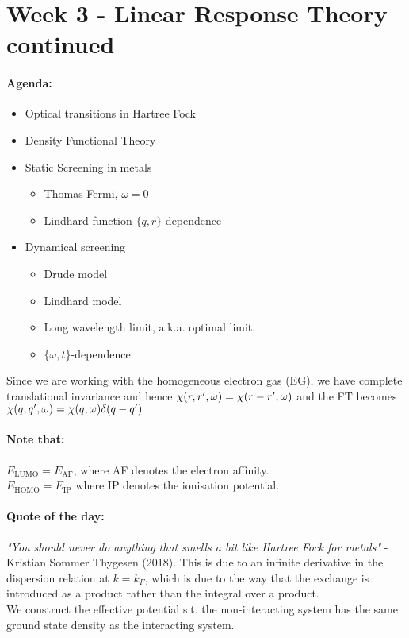 \section{Week 3 - Linear Response Theory continued}
\paragraph{Agenda:}
\begin{itemize}
    \item Optical transitions in Hartree Fock 
    \item Density Functional Theory
    \item Static Screening in metals
    \begin{itemize}
        \item Thomas Fermi, $\omega = 0$
        \item Lindhard function $\{q,r\}$-dependence
    \end{itemize}
    \item Dynamical screening
    \begin{itemize}
        \item Drude model
        \item Lindhard model
        \item Long wavelength limit, a.k.a. optimal limit.
        \item $\{\omega,t\}$-dependence
    \end{itemize}
\end{itemize}
Since we are working with the homogeneous electron gas (EG), we have complete translational invariance and hence $\chi\qty(r,r',\omega) = \chi \qty(r - r',\omega)$ and the FT becomes $\chi\qty(q,q',\omega) = \chi\qty(q,\omega)\delta\qty(q-q') $ \\ 
\paragraph{Note that:}
$E_{\mathrm{LUMO}} = E_{\mathrm{AF}}$, where AF denotes the electron affinity.\\
$E_{\mathrm{HOMO}} = E_{\mathrm{IP}}$ where IP denotes the ionisation potential. \\
\paragraph{Quote of the day:}
\emph{"You should never do anything that smells a bit like Hartree Fock for metals"} - Kristian Sommer Thygesen (2018). This is due to an infinite derivative in the dispersion relation at $k=k_F$, which is due to the way that the exchange is introduced as a product rather than the integral over a product.\\
We construct the effective potential s.t. the non-interacting system has the same ground state density as the interacting system.

